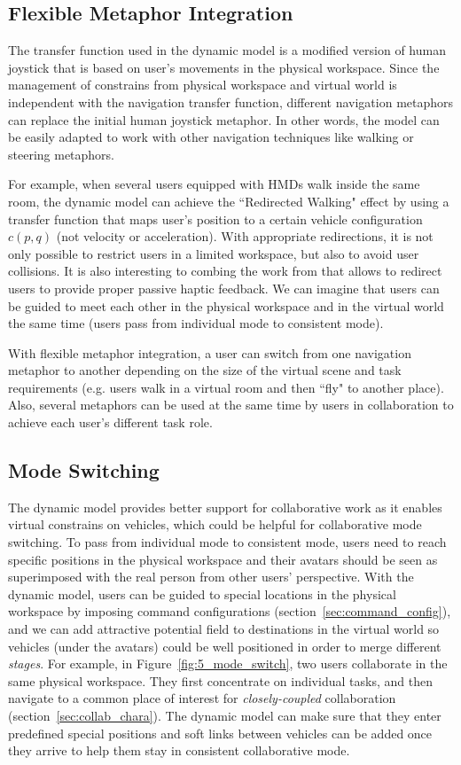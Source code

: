 \subsection{Flexible Metaphor Integration}

The transfer function used in the dynamic model is a modified version of human joystick that is based on user's movements in the physical workspace. Since the management of constrains from physical workspace and virtual world is independent with the navigation transfer function, different navigation metaphors can replace the initial human joystick metaphor. In other words, the model can be easily adapted to work with other navigation techniques like walking or steering metaphors.

For example, when several users equipped with HMDs walk inside the same room, the dynamic model can achieve the ``Redirected Walking" effect by using a transfer function that maps user's position to a certain vehicle configuration $c(p,q)$ (not velocity or acceleration). With appropriate redirections, it is not only possible to restrict users in a limited workspace, but also to avoid user collisions. It is also interesting to combing the work from \citet{Kohli2005Combining} that allows to redirect users to provide proper passive haptic feedback. We can imagine that users can be guided to meet each other in the physical workspace and in the virtual world the same time (users pass from individual mode to consistent mode).

With flexible metaphor integration, a user can switch from one navigation metaphor to another depending on the size of the virtual scene and task requirements (e.g. users walk in a virtual room and then ``fly" to another place). Also, several metaphors can be used at the same time by users in collaboration to achieve each user's different task role.


\subsection{Mode Switching}

The dynamic model provides better support for collaborative work as it enables virtual constrains on vehicles, which could be helpful for collaborative mode switching. To pass from individual mode to consistent mode, users need to reach specific positions in the physical workspace and their avatars should be seen as superimposed with the real person from other users' perspective. With the dynamic model, users can be guided to special locations in the physical workspace by imposing command configurations (section~\ref{sec:command_config}), and we can add attractive potential field to destinations in the virtual world so vehicles (under the avatars) could be well positioned in order to merge different \textit{stages}. For example, in Figure~\ref{fig:5_mode_switch}, two users collaborate in the same physical workspace. They first concentrate on individual tasks, and then navigate to a common place of interest for \textit{closely-coupled} collaboration (section~\ref{sec:collab_chara}). The dynamic model can make sure that they enter predefined special positions and soft links between vehicles can be added once they arrive to help them stay in consistent collaborative mode.

